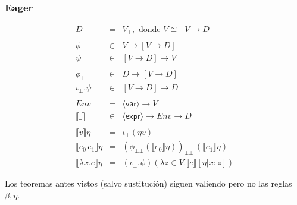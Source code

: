 \documentclass[12pt,a4paper]{article}
\newcommand{\PN}{\par\noindent}
\newcommand{\nonterminal}[1]{\langle \mathsf{#1} \rangle}
\newcommand{\expr}{\nonterminal{expr}}
\newcommand{\var}{\nonterminal{var}}
\newcommand{\botbot}{\bot\!\!\!\bot}
\begin{document}
    \subsubsection{Eager}
      \begin{eqnarray*}
        D &=& V_\bot, \text{ donde } V \cong [V \to D] \\ \\
        \phi &\in& V \to [V \to D] \\
        \psi &\in& [V \to D] \to V \\ \\
        \phi_{\botbot} &\in& D \to [V \to D] \\
        \iota_\bot . \psi &\in& [V \to D] \to D \\ \\
        Env &=& \var \to V \\
        \llbracket\_\rrbracket &\in& \expr \to Env \to D \\ \\
        \llbracket v\rrbracket\eta &=& \iota_\bot (\eta v) \\
        \llbracket e_0\, e_1\rrbracket\eta &=& (\phi_{\botbot} (\llbracket e_0\rrbracket\eta))_{\botbot}\, (\llbracket e_1\rrbracket\eta)\\
        \llbracket\lambda x.e\rrbracket\eta &=& (\iota_\bot . \psi)(\lambda z \in V. \llbracket e\rrbracket[\eta|x:z])
      \end{eqnarray*}

      \PN Los teoremas antes vistos (salvo sustitución) siguen valiendo pero no las reglas $\beta, \eta$.
        
\end{document}
